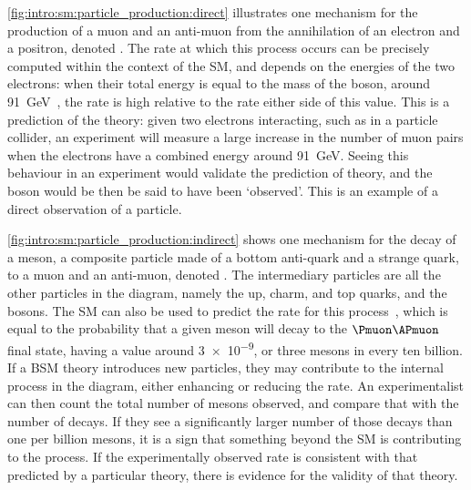 \cref{fig:intro:sm:particle_production:direct} illustrates one mechanism for 
the production of a muon and an anti-muon from the annihilation of an electron 
and a positron, denoted \decay{\Pelectron\APelectron}{\Pmuon\APmuon}.
The rate at which this process occurs can be precisely computed within the 
context of the \ac{SM}, and depends on the energies of the two electrons: when 
their total energy is equal to the mass of the \PZ boson, around 
\SI{91}{\GeV}~\cite{PDG2014}, the rate is high relative to the rate either side 
of this value.
This is a prediction of the theory: given two electrons interacting, such as in 
a particle collider, an experiment will measure a large increase in the number 
of muon pairs when the electrons have a combined energy around \SI{91}{\GeV}.
Seeing this behaviour in an experiment would validate the prediction of theory, 
and the \PZ boson would be then be said to have been `observed'.
This is an example of a direct observation of a particle.

\cref{fig:intro:sm:particle_production:indirect} shows one mechanism for the 
decay of a \PBs meson, a composite particle made of a bottom anti-quark and a 
strange quark, to a muon and an anti-muon, denoted \decay{\PBs}{\Pmuon\APmuon}.
The intermediary particles are all the other particles in the diagram, namely 
the up, charm, and top quarks, and the \PW bosons.
The \ac{SM} can also be used to predict the rate for this 
process~\cite{Bobeth:2013uxa}, which is equal to the probability that a given 
\PBs meson will decay to the $\Pmuon\APmuon$ final state, having a value around 
\num{3e-9}, or three \PBs mesons in every ten billion.
If a \ac{BSM} theory introduces new particles, they may contribute to the 
internal process in the diagram, either enhancing or reducing the rate.
An experimentalist can then count the total number of \PBs mesons observed, and 
compare that with the number of \decay{\PBs}{\Pmuon\APmuon} decays.
If they see a significantly larger number of those decays than one per billion 
\PBs mesons, it is a sign that something beyond the \ac{SM} is contributing to 
the process.
If the experimentally observed rate is consistent with that predicted by a 
particular theory, there is evidence for the validity of that theory.

